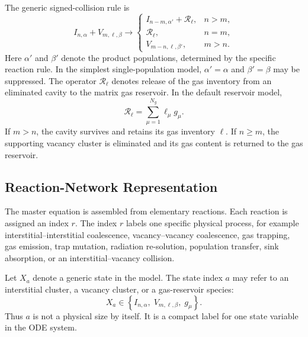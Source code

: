 The generic signed-collision rule is
\begin{equation}
    I_{n,\alpha}
    +
    V_{m,\boldsymbol{\ell},\beta}
    \longrightarrow
    \begin{cases}
    I_{n-m,\alpha'} + \mathcal{R}_{\boldsymbol{\ell}}, & n>m, \\[4pt]
    \mathcal{R}_{\boldsymbol{\ell}}, & n=m, \\[4pt]
    V_{m-n,\boldsymbol{\ell},\beta'}, & m>n .
    \end{cases}
    \label{eq:signed_collision_rule}
\end{equation}
Here $\alpha'$ and $\beta'$ denote the product populations, determined by the
specific reaction rule. In the simplest single-population model,
$\alpha'=\alpha$ and $\beta'=\beta$ may be suppressed. The operator
$\mathcal{R}_{\boldsymbol{\ell}}$ denotes release of the gas inventory from an
eliminated cavity to the matrix gas reservoir. In the default reservoir model,
\begin{equation}
    \mathcal{R}_{\boldsymbol{\ell}}
    =
    \sum_{\mu=1}^{N_g} \ell_\mu g_\mu .
    \label{eq:gas_release_operator}
\end{equation}
If $m>n$, the cavity survives and retains its gas inventory
$\boldsymbol{\ell}$. If $n\geq m$, the supporting vacancy cluster is
eliminated and its gas content is returned to the gas reservoir.

\subsection{Reaction-Network Representation}
\label{sec:reaction_network_representation}

The master equation is assembled from elementary reactions. Each reaction is
assigned an index $r$. The index $r$ labels one specific physical process, for
example interstitial--interstitial coalescence, vacancy--vacancy coalescence,
gas trapping, gas emission, trap mutation, radiation re-solution,
population transfer, sink absorption, or an interstitial--vacancy collision.

Let $X_a$ denote a generic state in the model. The state index $a$ may refer
to an interstitial cluster, a vacancy cluster, or a gas-reservoir species:
\begin{equation}
    X_a
    \in
    \left\{
    I_{n,\alpha},\;
    V_{m,\boldsymbol{\ell},\beta},\;
    g_\mu
    \right\}.
    \label{eq:generic_state_index}
\end{equation}
Thus $a$ is not a physical size by itself. It is a compact label for one state
variable in the ODE system.

